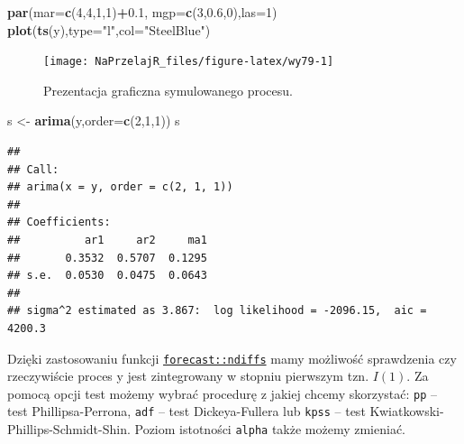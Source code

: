 \documentclass[polish,]{book}
\newenvironment{Shaded}{\begin{snugshade}}{\end{snugshade}}
\newcommand{\DataTypeTok}[1]{\textcolor[rgb]{0.13,0.29,0.53}{#1}}
\newcommand{\DecValTok}[1]{\textcolor[rgb]{0.00,0.00,0.81}{#1}}
\newcommand{\FloatTok}[1]{\textcolor[rgb]{0.00,0.00,0.81}{#1}}
\newcommand{\KeywordTok}[1]{\textcolor[rgb]{0.13,0.29,0.53}{\textbf{#1}}}
\newcommand{\NormalTok}[1]{#1}
\newcommand{\OperatorTok}[1]{\textcolor[rgb]{0.81,0.36,0.00}{\textbf{#1}}}
\newcommand{\StringTok}[1]{\textcolor[rgb]{0.31,0.60,0.02}{#1}}
\begin{document}
\begin{Shaded}
\begin{Highlighting}[]
\KeywordTok{par}\NormalTok{(}\DataTypeTok{mar=}\KeywordTok{c}\NormalTok{(}\DecValTok{4}\NormalTok{,}\DecValTok{4}\NormalTok{,}\DecValTok{1}\NormalTok{,}\DecValTok{1}\NormalTok{)}\OperatorTok{+}\FloatTok{0.1}\NormalTok{, }\DataTypeTok{mgp=}\KeywordTok{c}\NormalTok{(}\DecValTok{3}\NormalTok{,}\FloatTok{0.6}\NormalTok{,}\DecValTok{0}\NormalTok{),}\DataTypeTok{las=}\DecValTok{1}\NormalTok{)}
\KeywordTok{plot}\NormalTok{(}\KeywordTok{ts}\NormalTok{(y),}\DataTypeTok{type=}\StringTok{"l"}\NormalTok{,}\DataTypeTok{col=}\StringTok{"SteelBlue"}\NormalTok{)}
\end{Highlighting}
\end{Shaded}

\begin{figure}[h]

{\centering \texttt{[image: NaPrzelajR\_files/figure-latex/wy79-1]} 

}

\caption{Prezentacja graficzna symulowanego procesu.}\label{fig:wy79}
\end{figure}

\begin{Shaded}
\begin{Highlighting}[]
\NormalTok{s <-}\StringTok{ }\KeywordTok{arima}\NormalTok{(y,}\DataTypeTok{order=}\KeywordTok{c}\NormalTok{(}\DecValTok{2}\NormalTok{,}\DecValTok{1}\NormalTok{,}\DecValTok{1}\NormalTok{))}
\NormalTok{s}
\end{Highlighting}
\end{Shaded}

\begin{verbatim}
## 
## Call:
## arima(x = y, order = c(2, 1, 1))
## 
## Coefficients:
##          ar1     ar2     ma1
##       0.3532  0.5707  0.1295
## s.e.  0.0530  0.0475  0.0643
## 
## sigma^2 estimated as 3.867:  log likelihood = -2096.15,  aic = 4200.3
\end{verbatim}

Dzięki zastosowaniu funkcji \href{https://rdrr.io/cran/forecast/man/ndiffs.html}{\texttt{forecast::ndiffs}} mamy możliwość sprawdzenia czy rzeczywiście proces y jest zintegrowany w stopniu pierwszym tzn. \(I(1)\). Za pomocą opcji test możemy wybrać procedurę z jakiej chcemy skorzystać: \texttt{pp} -- test Phillipsa-Perrona, \texttt{adf} -- test Dickeya-Fullera lub \texttt{kpss} -- test Kwiatkowski-Phillips-Schmidt-Shin. Poziom istotności \texttt{alpha} także możemy zmieniać.
\end{document}
